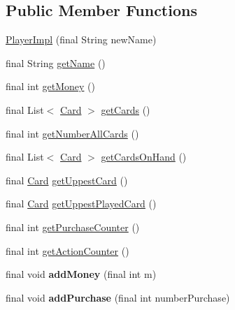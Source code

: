\subsection*{\-Public \-Member \-Functions}
\begin{DoxyCompactItemize}
\item 
\hyperlink{classdominion_1_1model_1_1PlayerImpl_a6a98f7f97e2c17376804f4cd99828d67}{\-Player\-Impl} (final \-String new\-Name)
\item 
final \-String \hyperlink{classdominion_1_1model_1_1PlayerImpl_a6df3ee42991c6d3f18c43f54bdaa8658}{get\-Name} ()
\item 
final int \hyperlink{classdominion_1_1model_1_1PlayerImpl_a81d5c283602362acad1e0403806711a9}{get\-Money} ()
\item 
final \-List$<$ \hyperlink{interfacedominion_1_1model_1_1cards_1_1Card}{\-Card} $>$ \hyperlink{classdominion_1_1model_1_1PlayerImpl_ab9dfd2a2f577ba3593943c21ecc4d96e}{get\-Cards} ()
\item 
final int \hyperlink{classdominion_1_1model_1_1PlayerImpl_a83864a29d4ba418be35dd1c35fefd7ef}{get\-Number\-All\-Cards} ()
\item 
final \-List$<$ \hyperlink{interfacedominion_1_1model_1_1cards_1_1Card}{\-Card} $>$ \hyperlink{classdominion_1_1model_1_1PlayerImpl_a3d8b4ba7a5aef3a082cec886953e310f}{get\-Cards\-On\-Hand} ()
\item 
final \hyperlink{interfacedominion_1_1model_1_1cards_1_1Card}{\-Card} \hyperlink{classdominion_1_1model_1_1PlayerImpl_a9dda36c19ac09d58b18acdf679929a8f}{get\-Uppest\-Card} ()
\item 
final \hyperlink{interfacedominion_1_1model_1_1cards_1_1Card}{\-Card} \hyperlink{classdominion_1_1model_1_1PlayerImpl_a1ae6f2bb37741a67aef2cfef92867d64}{get\-Uppest\-Played\-Card} ()
\item 
final int \hyperlink{classdominion_1_1model_1_1PlayerImpl_a1af465bde2c226d74529b48e9a605214}{get\-Purchase\-Counter} ()
\item 
final int \hyperlink{classdominion_1_1model_1_1PlayerImpl_ae05d84225a6275c0226502b51d59f0fb}{get\-Action\-Counter} ()
\item 
\hypertarget{classdominion_1_1model_1_1PlayerImpl_abbcc9b13557b94a4523fb2bbbf14b791}{final void {\bfseries add\-Money} (final int m)}\label{classdominion_1_1model_1_1PlayerImpl_abbcc9b13557b94a4523fb2bbbf14b791}

\item 
\hypertarget{classdominion_1_1model_1_1PlayerImpl_a2af3e776c76fdd259509d26b7c28d4f1}{final void {\bfseries add\-Purchase} (final int number\-Purchase)}\label{classdominion_1_1model_1_1PlayerImpl_a2af3e776c76fdd259509d26b7c28d4f1}


\end{DoxyCompactItemize}
